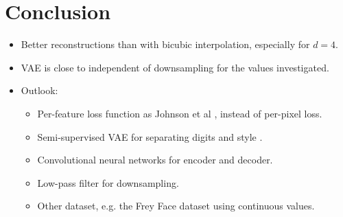 \section{Conclusion} \label{sec:conclusion}

\begin{itemize}
	\item Better reconstructions than with bicubic interpolation, especially for $d = 4$.
	\item VAE is close to independent of downsampling for the values investigated.
	\item Outlook:
	\begin{itemize}
		\item Per-feature loss function as Johnson et al \cite{Johnson16}, instead of per-pixel loss.
		\item Semi-supervised VAE for separating digits and style \cite{Kingma2014}.
		\item Convolutional neural networks for encoder and decoder.
		\item Low-pass filter for downsampling.
		\item Other dataset, e.g. the Frey Face dataset \cite{Frey} using continuous values. 
	\end{itemize}
\end{itemize}
